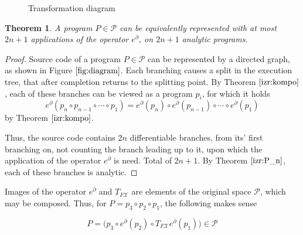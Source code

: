 \documentclass{article}
\newcommand{\X}{\mathcal{X}}
\newcommand{\dP}{\mathcal{P}}
\newcommand{\D}{\partial}
\newtheorem{izrek}{Theorem}[section]
\begin{document}
\begin{figure}[!h]
\vspace{3px}
\caption{Transformation diagram} \label{fig:diagram} 
\end{figure}

\begin{izrek}
A program $P\in\dP$ can be equivalently represented with at most $2n+1$ applications of the operator $e^\D$, on $2n+1$ analytic programs.
\end{izrek}

\begin{proof}
	Source code of a program $P\in\dP$ can be represented by a directed graph, as shown in Figure $\ref{fig:diagram}$. Each branching causes a split in the execution tree, that after completion returns to the splitting point.
	By Theorem $\ref{izr:kompo}$, each of these branches can be viewed as a program $p_i$, for which it holds $$e^\D(p_n\circ p_{n-1}\circ\cdots\circ p_1)=e^\D(p_n)\circ e^\D(p_{n-1})\circ\cdots\circ e^\D(p_1)$$ by Theorem $\ref{izr:kompo}$.
	
	Thus, the source code contains $2n$ differentiable branches, from its' first branching on, not counting the branch leading up to it, upon which the application of the operator $e^\D$ is need. Total of $2n+1$. By Theorem $\ref{izr:P_n}$, each of these branches is analytic.
\end{proof}

Images of the operator $e^\D$ and $T_{F\X}$  are elements of the original space $\dP$, which may be composed. Thus, for $P=p_3\circ p_2\circ p_1$, the following makes sense

\begin{equation}
P=\Big(p_3\circ e^ \D(p_2)\circ T_{F\X}e^\D(p_1)\Big) \in \dP
\end{equation}
\end{document}
